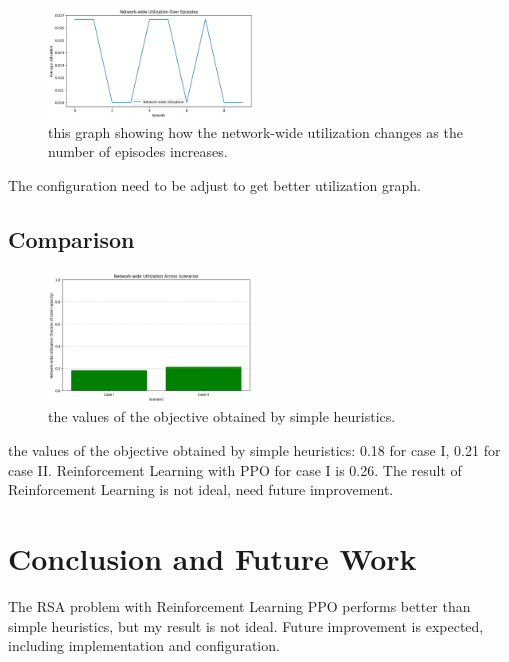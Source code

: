 \documentclass[conference]{IEEEtran}
\begin{document}
\begin{figure}[htbp]
\centering
\includegraphics[width=0.48\textwidth]{objvsepisode.png}
\caption{this graph showing how the network-wide utilization changes as the number of episodes increases.}
\label{fig:objective}
\end{figure}
The configuration need to be adjust to get better utilization graph.

\subsection{Comparison}
\begin{figure}[htbp]
\centering
\includegraphics[width=0.48\textwidth]{noRL.png}
\caption{the values of the objective obtained by simple heuristics.}
\label{fig:objectivevalue}
\end{figure}
the values of the objective obtained by simple heuristics: 0.18 for case I, 0.21 for case II. Reinforcement Learning with PPO for case I is 0.26. The result of Reinforcement Learning is not ideal, need future improvement.

\section{Conclusion and Future Work}
The RSA problem with Reinforcement Learning PPO performs better than simple heuristics, but my result is not ideal.
Future improvement is expected, including implementation and configuration.



\end{document}
